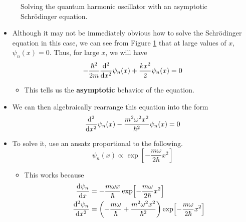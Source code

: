 \documentclass[../notes.tex]{subfiles}
\begin{document}
\begin{itemize}
\begin{figure}[h!]
        \caption{Solving the quantum harmonic oscillator with an asymptotic Schr\"{o}dinger equation.}
        \label{fig:harmOscSol}
    \end{figure}
    \begin{itemize}
        \item Although it may not be immediately obvious how to solve the Schr\"{o}dinger equation in this case, we can see from Figure \ref{fig:harmOscSol} that at large values of $x$, $\psi_n(x)=0$. Thus, for large $x$, we will have
        \begin{equation*}
            -\frac{\hbar^2}{2m}\dv[2]{x}\psi_n(x)+\frac{kx^2}{2}\psi_n(x) = 0
        \end{equation*}
        \begin{itemize}
            \item This tells us the \textbf{asymptotic} behavior of the equation.
        \end{itemize}
        \item We can then algebraically rearrange this equation into the form
        \begin{equation*}
            \dv[2]{x}\psi_n(x)-\frac{m^2\omega^2x^2}{\hbar^2}\psi_n(x) = 0
        \end{equation*}
        \item To solve it, use an ansatz proportional to the following.
        \begin{equation*}
            \psi_n(x) \propto \exp[-\frac{m\omega}{2\hbar}x^2]
        \end{equation*}
        \begin{itemize}
            \item This works because
            \begin{align*}
                \dv{\psi_n}{x} &= -\frac{m\omega x}{\hbar}\exp[-\frac{m\omega}{2\hbar}x^2]\\
                \dv[2]{\psi_n}{x} &= \left( -\frac{m\omega}{\hbar}+\frac{m^2\omega^2x^2}{\hbar^2} \right)\exp[-\frac{m\omega}{2\hbar}x^2]
            \end{align*}
        \end{itemize}

\end{itemize}
\end{itemize}
\end{document}
